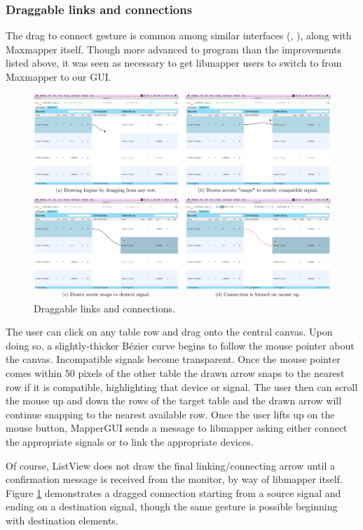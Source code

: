 		\subsubsection{Draggable links and connections}

The drag to connect gesture is common among similar interfaces (, ), along with Maxmapper itself. Though more advanced to program than the improvements listed above, it was seen as necessary to get libmapper users to switch to from Maxmapper to our GUI.

\begin{figure}[h]
	\centering
	\includegraphics[width=1\textwidth]{figures/drawing}
	\caption{Draggable links and connections.}
	\label{fig:drawing}
\end{figure}

The user can click on any table row and drag onto the central canvas. Upon doing so, a slightly-thicker B\'ezier curve begins to follow the mouse pointer about the canvas. Incompatible signals become transparent. Once the mouse pointer comes within 50 pixels of the other table the drawn arrow snaps to the nearest row if it is compatible, highlighting that device or signal. The user then can scroll the mouse up and down the rows of the target table and the drawn arrow will continue snapping to the nearest available row. Once the user lifts up on the mouse button, MapperGUI sends a message to libmapper asking either connect the appropriate signals or to link the appropriate devices.

Of course, ListView does not draw the final linking/connecting arrow until a confirmation message is received from the monitor, by way of libmapper itself. Figure \ref{fig:drawing} demonstrates a dragged connection starting from a source signal and ending on a destination signal, though the same gesture is possible beginning with destination elements.

